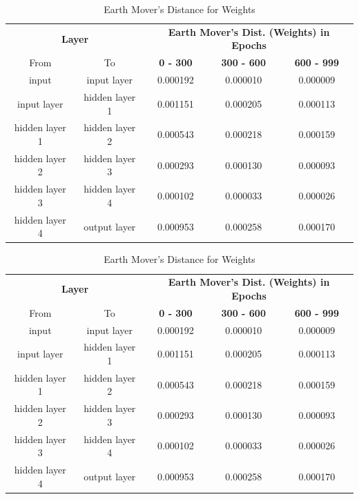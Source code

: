 \documentclass{ioereport}
\begin{document}
    \begin{table}[H]
    \caption{Earth Mover's Distance for Weights}
    \centering
    \begin{tabular}{|c|c|c|c|c|}
    \hline
    \multicolumn{2}{|c|}{\textbf{Layer}} & \multicolumn{3}{c|}{\textbf{Earth Mover's Dist. (Weights) in Epochs}} \\
    \cline{1-5}
    From & To & \textbf{0 - 300} & \textbf{300 - 600} & \textbf{600 - 999} \\
    \hline
    input & input layer & 0.000192 & 0.000010 & 0.000009 \\
    input layer & hidden layer 1 & 0.001151 & 0.000205 & 0.000113 \\
    hidden layer 1 & hidden layer 2 & 0.000543 & 0.000218 & 0.000159 \\
    hidden layer 2 & hidden layer 3 & 0.000293 & 0.000130 & 0.000093 \\
    hidden layer 3 & hidden layer 4 & 0.000102 & 0.000033 & 0.000026 \\
    hidden layer 4 & output layer & 0.000953 & 0.000258 & 0.000170 \\
    \hline
    \end{tabular}
    \end{table}

    \begin{table}[H]
    \caption{Earth Mover's Distance for Weights}
    \centering
    \begin{tabular}{|c|c|c|c|c|}
    \hline
    \multicolumn{2}{|c|}{\textbf{Layer}} & \multicolumn{3}{c|}{\textbf{Earth Mover's Dist. (Weights) in Epochs}} \\
    \cline{1-5}
    From & To & \textbf{0 - 300} & \textbf{300 - 600} & \textbf{600 - 999} \\
    \hline
    input & input layer & 0.000192 & 0.000010 & 0.000009 \\
    input layer & hidden layer 1 & 0.001151 & 0.000205 & 0.000113 \\
    hidden layer 1 & hidden layer 2 & 0.000543 & 0.000218 & 0.000159 \\
    hidden layer 2 & hidden layer 3 & 0.000293 & 0.000130 & 0.000093 \\
    hidden layer 3 & hidden layer 4 & 0.000102 & 0.000033 & 0.000026 \\
    hidden layer 4 & output layer & 0.000953 & 0.000258 & 0.000170 \\
    \hline
    \end{tabular}
    \end{table}
\end{document}
